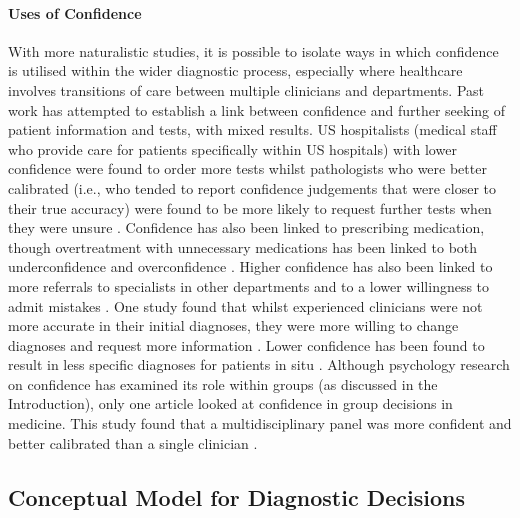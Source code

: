 \documentclass[a4paper, nobind]{templates/ociamthesis}
\begin{document}
\paragraph*{Uses of Confidence}\label{uses-of-confidence}

With more naturalistic studies, it is possible to isolate ways in which confidence is utilised within the wider diagnostic process, especially where healthcare involves transitions of care between multiple clinicians and departments. Past work has attempted to establish a link between confidence and further seeking of patient information and tests, with mixed results. US hospitalists (medical staff who provide care for patients specifically within US hospitals) with lower confidence were found to order more tests \autocite{gupta_associations_2023} whilst pathologists who were better calibrated (i.e., who tended to report confidence judgements that were closer to their true accuracy) were found to be more likely to request further tests when they were unsure \autocite{clayton_are_2023}. Confidence has also been linked to prescribing medication, though overtreatment with unnecessary medications has been linked to both underconfidence \autocite{levin_antimicrobial_2012} and overconfidence \autocite{garbayo_metacognitive_2023}. Higher confidence has also been linked to more referrals to specialists in other departments \autocite{calman_variability_1992} and to a lower willingness to admit mistakes \autocite{brezis_does_2019}. One study found that whilst experienced clinicians were not more accurate in their initial diagnoses, they were more willing to change diagnoses and request more information \autocite{krupat_avoiding_2017}. Lower confidence has been found to result in less specific diagnoses for patients in situ \autocite{hageman_surgeon_2013}. Although psychology research on confidence has examined its role within groups (as discussed in the Introduction), only one article looked at confidence in group decisions in medicine. This study found that a multidisciplinary panel was more confident and better calibrated than a single clinician \autocite{thorlacius-ussing_comparing_2021}.

\subsection*{Conceptual Model for Diagnostic Decisions}\label{conceptual-model-for-diagnostic-decisions}
\end{document}
